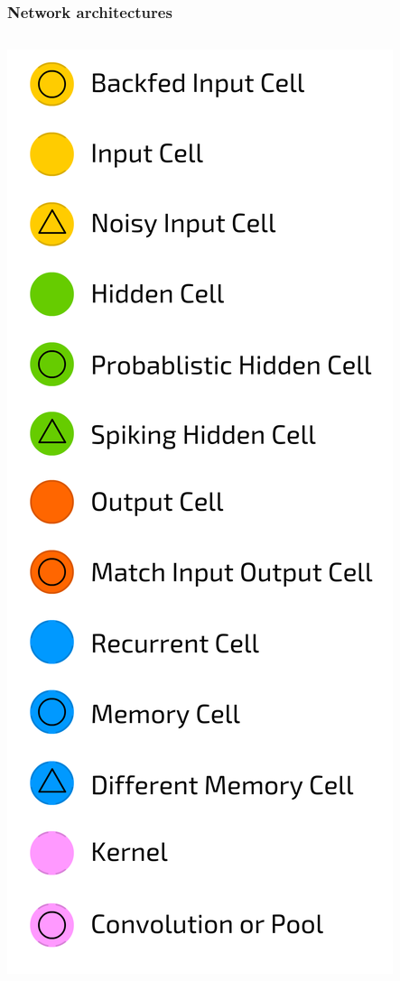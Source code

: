 \documentclass[12pt, aspectratio = 169]{beamer}
\begin{document}
\begin{frame}[c]
	\frametitle{Network architectures}
	\begin{columns}
		\includegraphics[width=1\linewidth]{networkZooPoster_leg}

\end{columns}
\end{frame}
\end{document}

